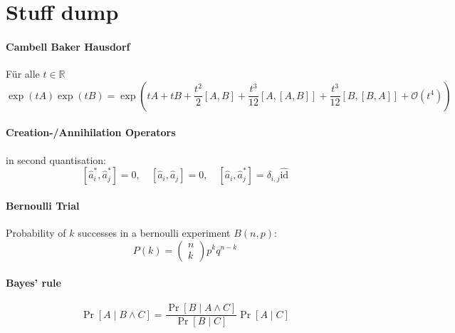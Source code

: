 




\usepackage[arrow, matrix, curve]{xy}
\usepackage{wrapfig}
\usepackage{bm}
\usepackage{multicol}
\usepackage{xcolor}
\usepackage{mathrsfs} 
\renewcommand\vec{\boldsymbol}




\section{Stuff dump}

\paragraph{Cambell Baker Hausdorf} Für alle $t \in \mathbb{R}$ 
$$ 
\exp(t A) \exp(t B)= \exp \left(t A+t B+\frac{t^2}{2}[A, B]
+\frac{t^3}{12} [A,[A, B]] +\frac{t^3}{12}[B,[B, A]]+\mathscr{O}\left(t^4\right)\right)
$$

\paragraph{Creation-/Annihilation Operators}in second quantisation:
$$\left[\hat{a}_i^*, \hat{a}_j^*\right]=0, \quad\left[\hat{a}_i, \hat{a}_j\right]=0, \quad\left[\hat{a}_i, \hat{a}_j^*\right]=\delta_{i, j} \hat{\mathrm{id}}$$


\paragraph{Bernoulli Trial} Probability of $k$ successes in a bernoulli experiment $B(n,p)$:
$$P(k)=\left(\begin{array}{l}
  n \\
  k
  \end{array}\right) p^k q^{n-k} $$

\paragraph{Bayes' rule}  $$
\operatorname{Pr}[A \mid B \wedge C]=\frac{\operatorname{Pr}[B \mid A \wedge C]}{\operatorname{Pr}[B \mid C]} \operatorname{Pr}[A \mid C]
$$

